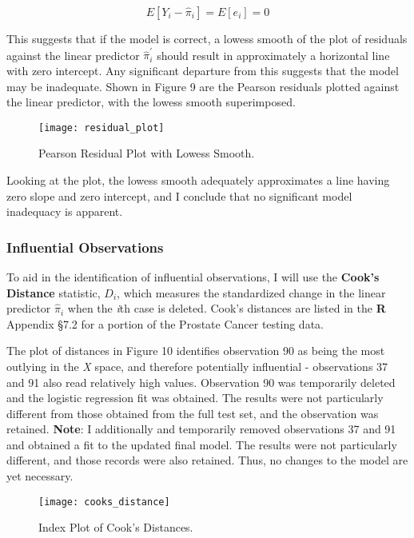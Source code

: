 \begin{equation}
E[Y_i-\hat{\pi}_i]=E[e_i]=0
\end{equation}

This suggests that if the model is correct, a lowess smooth of the plot of residuals against the linear predictor \(\hat{\pi}^{'}_i\) should result in approximately a horizontal line with zero intercept. Any significant departure from this suggests that the model may be inadequate. Shown in Figure 9 are the Pearson residuals plotted against the linear predictor, with the lowess smooth superimposed.

\begin{figure}[H]
	\centering
	\texttt{[image: residual\_plot]}
	\caption{Pearson Residual Plot with Lowess Smooth.}
\end{figure}

Looking at the plot, the lowess smooth adequately approximates a line having zero slope and zero intercept, and I conclude that no significant model inadequacy is apparent. 

\subsubsection{Influential Observations}
To aid in the identification of influential observations, I will use the \textbf{Cook's Distance} statistic, \(D_i\), which measures the standardized change in the linear predictor \(\hat{\pi}_i\) when the \textit{i}th case is deleted. Cook's distances are listed in the \textbf{R} Appendix \S7.2 for a portion of the Prostate Cancer testing data. \par
The plot of distances in Figure 10 identifies observation 90 as being the most outlying in the \textit{X} space, and therefore potentially influential - observations 37 and 91 also read relatively high values. Observation 90 was temporarily deleted and the logistic regression fit was obtained. The results were not particularly different from those obtained from the full test set, and the observation was retained. \textbf{Note}: I additionally and temporarily removed observations 37 and 91 and obtained a fit to the updated final model. The results were not particularly different, and those records were also retained. Thus, no changes to the model are yet necessary.

\begin{figure}[H]
	\centering
	\texttt{[image: cooks\_distance]}
	\caption{Index Plot of Cook's Distances.}
\end{figure}


